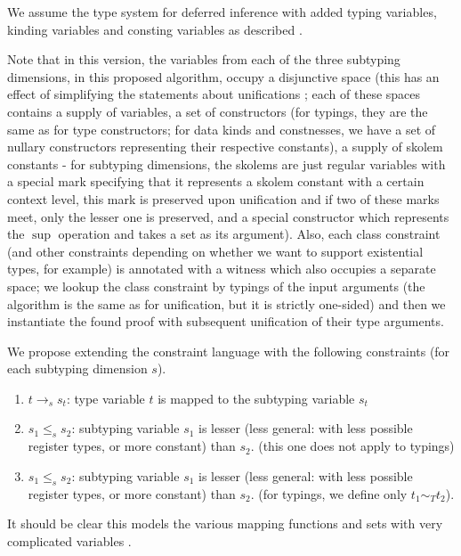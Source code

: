 We assume the type system for deferred inference with added typing variables, kinding variables and consting variables as described .

Note that in this version, the variables from each of the three subtyping dimensions, in this proposed algorithm, occupy a disjunctive space (this has an effect of simplifying the statements about unifications ; each of these spaces contains a supply of variables, a set of constructors (for typings, they are the same as for type constructors; for data kinds and constnesses, we have a set of nullary constructors representing their respective constants), a supply of skolem constants - for subtyping dimensions, the skolems are just regular variables with a special mark specifying that it represents a skolem constant with a certain context level, this mark is preserved upon unification and if two of these marks meet, only the lesser one is preserved, and a special constructor which represents the $\sup$ operation and takes a set as its argument). Also, each class constraint (and other constraints depending on whether we want to support existential types, for example) is annotated with a witness which also occupies a separate space; we lookup the class constraint by typings of the input arguments (the algorithm is the same as for unification, but it is strictly one-sided) and then we instantiate the found proof with subsequent unification of their type arguments.

We propose extending the constraint language with the following constraints (for each subtyping dimension $s$).

\begin{enumerate}
    \item $t \to_s s_t$: type variable $t$ is mapped to the subtyping variable $s_t$

    \item $s_1 \leq_s s_2$: subtyping variable $s_1$ is lesser (less general: with less possible register types, or more constant) than $s_2$. (this one does not apply to typings)

    \item $s_1 \leq_s s_2$: subtyping variable $s_1$ is lesser (less general: with less possible register types, or more constant) than $s_2$. (for typings, we define only $t_1 \sim_T t_2$).
\end{enumerate}

It should be clear this models the various mapping functions and sets with very complicated variables .


